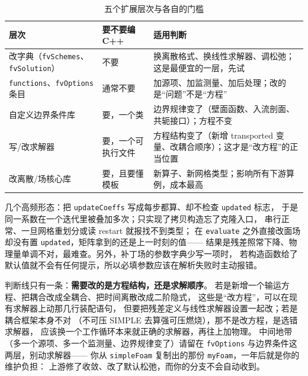 \documentclass[12pt,a4paper,fontset=fandol]{ctexbook}
\newcommand{\Tp}[1]{\texttt{#1}}
\newcommand{\Lang}[1]{\textsf{#1}}
\newcommand{\CPP}{\Lang{C++}}
\begin{document}
\begin{table}[htbp]
\centering
\caption{五个扩展层次与各自的门槛}
\label{tab:ch06-layers}
\begin{tabular}{>{\raggedright\arraybackslash}p{}>{\raggedright\arraybackslash}p{}>{\raggedright\arraybackslash}p{}}
\toprule
层次 & 要不要编 \CPP{} & 适用判断 \\
\midrule
改字典（\Tp{fvSchemes}、\Tp{fvSolution}） & 不要 & 换离散格式、换线性求解器、调松弛；这是最便宜的一层，先试 \\
\Tp{functions}、\Tp{fvOptions} 条目 & 通常不要 & 加源项、加监测量、加后处理；改的是``问题''不是``方程'' \\
自定义边界条件库 & 要，一个类 & 边界规律变了（壁面函数、入流剖面、共轭接口）；方程不变 \\
写/改求解器 & 要，一个可执行文件 & 方程结构变了（新增 transported 变量、改耦合顺序）；这才是``改方程''的正当位置 \\
改离散/场核心库 & 要，且要懂模板 & 新算子、新网格类型；影响所有下游算例，成本最高 \\
\bottomrule
\end{tabular}
\end{table}

\begin{warning}[title={边界条件写了但字典不生效，或旧系数被静默复用}]
几个高频形态：把 \Tp{updateCoeffs} 写成每步都算、却不检查 \Tp{updated} 标志，
于是同一系数在一个迭代里被叠加多次；只实现了拷贝构造忘了克隆入口，
串行正常、一旦网格重划分或读 restart 就报找不到类型；
在 \Tp{evaluate} 之外直接改面场却没有置 \Tp{updated}，矩阵拿到的还是上一时刻的值——
结果是残差照常下降、物理量单调不对，最难查。另外，补丁场的参数字典少写一项时，
若构造函数给了默认值就不会有任何提示，所以必填参数应该在解析失败时主动报错。
\end{warning}

\begin{bestpractice}[title={什么时候改方程，什么时候换求解器}]
判断线只有一条：\textbf{需要改的是方程结构，还是求解顺序}。
若是新增一个输运方程、把耦合改成全耦合、把时间离散改成二阶隐式，
这些是``改方程''，可以在现有求解器上动那几行装配语句，
但要把残差定义与线性求解器设置一起改；若是耦合框架本身不对
（不可压 SIMPLE 去算强可压燃烧），那不是改方程，是选错求解器，
应该换一个工作循环本来就正确的求解器，再往上加物理。
中间地带（多一个源项、多一个监测量、边界规律变了）请留在
\Tp{fvOptions} 与边界条件这两层，别动求解器——
你从 \Tp{simpleFoam} 复制出的那份 \Tp{myFoam}，一年后就是你的维护负担：
上游修了收敛、改了默认松弛，而你的分支不会自动收到。
\end{bestpractice}
\end{document}
